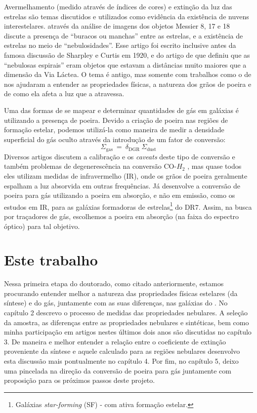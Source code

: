 Avermelhamento (medido através de índices de cores) e extinção da luz das estrelas são temas
discutidos e utilizados como evidência da existência de nuvens interestelares. \citep{Barnard.1908a}
através da análise de imagens dos objetos Messier 8, 17 e 18 discute a presença de ``buracos ou
manchas'' entre as estrelas, e a existência de estrelas no meio de ``nebulosidades''. Esse artigo
foi escrito inclusive antes da famosa discussão de Sharpley e Curtis em 1920, e do artigo de
\citep{Hubble.1925a} que definiu que as ``nebulosas espirais'' eram objetos que estavam a distâncias
muito maiores que a dimensão da Via Láctea. O tema é antigo, mas somente com trabalhos como o de
\citep{Draine.2003a} nos ajudaram a entender as propriedades físicas, a natureza dos grãos de
poeira e de como ela afeta a luz que a atravessa.

Uma das formas de se mapear e determinar quantidades de gás em galáxias é utilizando a presença de
poeira. Devido a criação de poeira nas regiões de formação estelar, podemos utilizá-la como maneira
de medir a densidade superficial do gás oculto através da introdução de um fator de conversão:
\begin{equation}
	\label{eq:dust2gas}
	\Sigma_{\mathrm{gas}}\ =\ \delta_{\mathrm{DGR}}\ \Sigma_{\mathrm{dust}}
\end{equation}
\noindent Diversos artigos discutem a calibração e os {\em caveats} deste tipo de conversão e também
problemas de degenerescência na conversão CO-$H_2$ \citep{Guiderdoni.Rocca.1987, Leroy.etal.2011a,
Leroy.etal.2013a, RemyRuyer.etal.2014a}, mas quase todos eles utilizam medidas de infravermelho
(IR), onde os grãos de poeira geralmente espalham a luz absorvida em outras frequências.
Já \citet{Brinchmann.etal.2013a} desenvolve a conversão de poeira para gás utilizando a poeira em
absorção, e não em emissão, como os estudos em IR, para as galáxias formadoras de
estrelas\footnote{Galáxias {\em star-forming} (SF) - com ativa formação estelar.} do \SDSS DR7.
Assim, na busca por traçadores de gás, escolhemos a poeira em absorção (na faixa do espectro óptico)
para tal objetivo.

\section{Este trabalho}
\label{sec:intro:estetrabalho}

Nessa primeira etapa do doutorado, como citado anteriormente, estamos procurando entender melhor a
natureza das propriedades físicas estelares (da síntese) e do gás, juntamente com as suas
diferenças, nas galáxias do \PCAL. No capítulo 2 descrevo o processo de medidas das propriedades
nebulares. A seleção da amostra, as diferenças entre as propriedades nebulares e sintéticas, bem
como minha participação em artigos nestes últimos dois anos são discutidas no capítulo 3. De maneira
e melhor entender a relação entre o coeficiente de extinção proveniente da síntese e aquele
calculado para as regiões nebulares desenvolvo esta discussão mais pontualmente no capítulo 4. Por fim, no
capítulo 5, deixo uma pincelada na direção da conversão de poeira para gás juntamente com
proposição para os próximos passos deste projeto.

